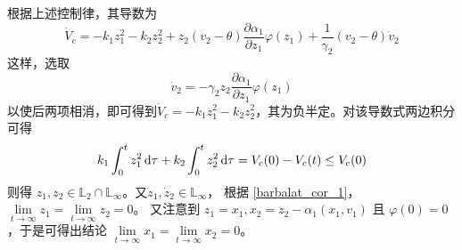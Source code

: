 根据上述控制律，其导数为
\[ \dot{V}_c = - k_1 z^2_1 - k_2 z^2_2 + z_2 (v_2 - \theta) \frac{\partial
   \alpha_1}{\partial z_1} \varphi (z_1) + \frac{1}{\gamma_2} (v_2 - \theta)
   \dot{v}_2 \]
这样，选取\[\dot{v}_2 = - \gamma_2 z_2 \frac{\partial \alpha_1}{\partial z_1}
\varphi (z_1)\]以使后两项相消，即可得到$\dot{V}_c = - k_1 z^2_1 - k_2 z^2_2$，其为负半定。对该导数式两边积分可得
\[ k_1 \int^t_0 z^2_1 \mathop{}\!\mathrm{d} \tau + k_2 \int^t_0 z^2_2 \mathop{}\!\mathrm{d} \tau = V_c (0) - V_c (t)  \leq V_c (0) \]
则得 $z_1, z_2 \in \mathbb{L}_2 \cap \mathbb{L}_{\infty}$。又$\dot{z}_1,
\dot{z}_2 \in \mathbb{L}_{\infty}$，
根据 \ref{barbalat_cor_1}，$\lim\limits_{t \rightarrow \infty} z_1 = \lim\limits_{t \rightarrow
\infty} z_2 = 0$。
又注意到 $z_1 = x_1, x_2 = z_2 - \alpha_1 (x_1, v_1)$ 且 $\varphi (0) = 0$，于是可得出结论 $\lim\limits_{t \rightarrow \infty} x_1 = \lim\limits_{t \rightarrow \infty} x_2 = 0$。
